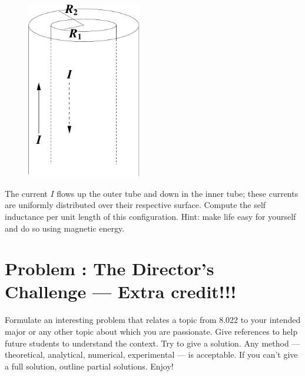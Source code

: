 \documentclass[problems]{esg8022pset}
\begin{document}
  \begin{figure}[H]
    \centering
    \includegraphics[width = 5cm]{coaxind}
    \label{fig:coax}
  \end{figure}

\par\noindent The current $I$ flows up the outer tube and down in the
inner tube; these currents are uniformly distributed over their
respective surface.  Compute the self inductance per unit length of
this configuration.  Hint: make life easy for yourself and do so using
magnetic energy.
\section{Problem \thesection: The Director's Challenge --- Extra credit!!!}
   Formulate an interesting problem that relates a topic from 8.022 to your
  intended major or any other topic about which you are passionate.  Give references
  to help future students to understand the context.  Try to give a solution.
  Any method --- theoretical, analytical, numerical, experimental --- is acceptable.
  If you can't give a full solution, outline partial solutions. Enjoy!
\end{document}
